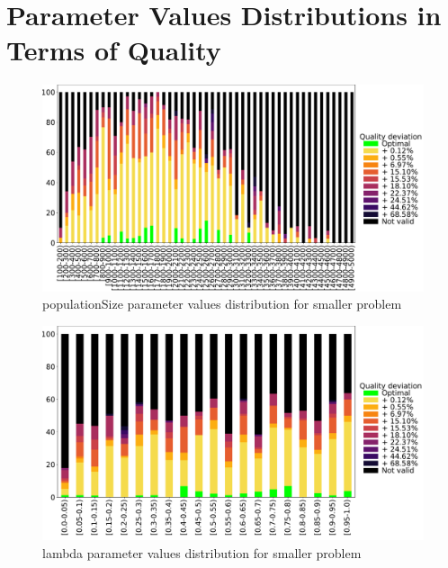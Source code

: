 \chapter{Parameter Values Distributions in Terms of Quality}\label{appendix:Distributions3}
\begin{figure}
	\centering
	\includegraphics[width=\textwidth]{images/DistrObj/populationSize.pdf}
	\caption[populationSize parameter values distribution for smaller problem]{populationSize parameter values distribution for smaller problem}
	\label{fig:populationSize_Obj}
\end{figure}
\begin{figure}
	\centering
	\includegraphics[width=\textwidth]{images/DistrObj/lambda.pdf}
	\caption[lambda parameter values distribution for smaller problem]{lambda parameter values distribution for smaller problem}
	\label{fig:lambda_Obj}
\end{figure}

